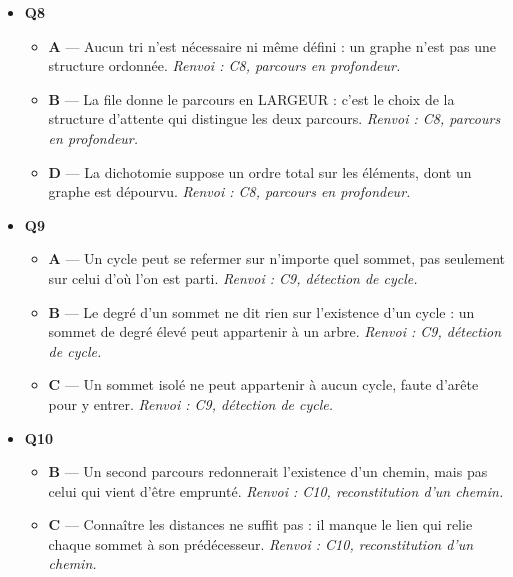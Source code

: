\begin{itemize}
\begin{itemize}
    \item \textbf{A} — La numérotation des sommets n'a aucune influence : seule la structure des arêtes gouverne l'ordre de visite. \emph{Renvoi : C7, parcours en largeur d'un graphe.}
    \item \textbf{C} — C'est le parcours en PROFONDEUR. Le parcours en largeur épuise un niveau entier avant de passer au suivant. \emph{Renvoi : C7, largeur et profondeur.}
    \item \textbf{D} — Le parcours est déterministe une fois fixé l'ordre des voisins dans la structure de données. \emph{Renvoi : C7, parcours en largeur d'un graphe.}
  \end{itemize}
  \item \textbf{Q8}
  \begin{itemize}
    \item \textbf{A} — Aucun tri n'est nécessaire ni même défini : un graphe n'est pas une structure ordonnée. \emph{Renvoi : C8, parcours en profondeur.}
    \item \textbf{B} — La file donne le parcours en LARGEUR : c'est le choix de la structure d'attente qui distingue les deux parcours. \emph{Renvoi : C8, parcours en profondeur.}
    \item \textbf{D} — La dichotomie suppose un ordre total sur les éléments, dont un graphe est dépourvu. \emph{Renvoi : C8, parcours en profondeur.}
  \end{itemize}
  \item \textbf{Q9}
  \begin{itemize}
    \item \textbf{A} — Un cycle peut se refermer sur n'importe quel sommet, pas seulement sur celui d'où l'on est parti. \emph{Renvoi : C9, détection de cycle.}
    \item \textbf{B} — Le degré d'un sommet ne dit rien sur l'existence d'un cycle : un sommet de degré élevé peut appartenir à un arbre. \emph{Renvoi : C9, détection de cycle.}
    \item \textbf{C} — Un sommet isolé ne peut appartenir à aucun cycle, faute d'arête pour y entrer. \emph{Renvoi : C9, détection de cycle.}
  \end{itemize}
  \item \textbf{Q10}
  \begin{itemize}
    \item \textbf{B} — Un second parcours redonnerait l'existence d'un chemin, mais pas celui qui vient d'être emprunté. \emph{Renvoi : C10, reconstitution d'un chemin.}
    \item \textbf{C} — Connaître les distances ne suffit pas : il manque le lien qui relie chaque sommet à son prédécesseur. \emph{Renvoi : C10, reconstitution d'un chemin.}

\end{itemize}
\end{itemize}
